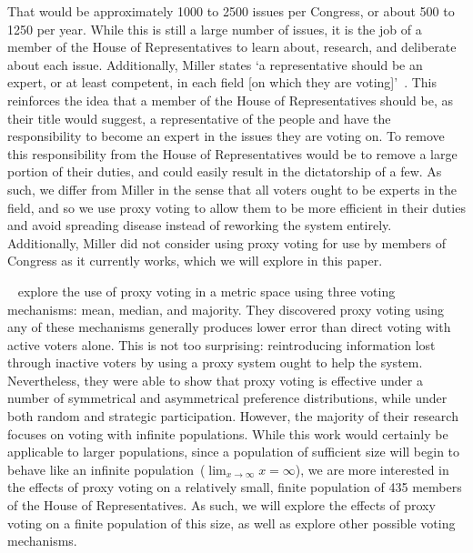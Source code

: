 That would be approximately 1000 to 2500 issues per Congress, or about 500 to 1250 per
year.
While this is still a large number of issues, it is the job of a member of the House
of Representatives to learn about, research, and deliberate about each issue.
Additionally, Miller states `a representative should be an expert, or at least
competent, in each field [on which they are voting]'~\cite{Miller1969}.
This reinforces the idea that a member of the House of Representatives should be, as
their title would suggest, a representative of the people and have the responsibility
to become an expert in the issues they are voting on.
To remove this responsibility from the House of Representatives would be to remove
a large portion of their duties, and could easily result in the dictatorship of a few.
As such, we differ from Miller in the sense that all voters ought to be experts in
the field, and so we use proxy voting to allow them to be more efficient in their
duties and avoid spreading disease instead of reworking the system entirely.
Additionally, Miller did not consider using proxy voting for use by members of
Congress as it currently works, which we will explore in this paper.

~\cite{Cohensius2017} explore the use of proxy voting in a metric space
using three voting mechanisms: mean, median, and majority.
They discovered proxy voting using any of these mechanisms generally produces lower
error than direct voting with active voters alone.
This is not too surprising: reintroducing information lost through inactive voters by
using a proxy system ought to help the system.
Nevertheless, they were able to show that proxy voting is effective under a number of
symmetrical and asymmetrical preference distributions, while under both random and
strategic participation.
However, the majority of their research focuses on voting with infinite populations.
While this work would certainly be applicable to larger populations, since a
population of sufficient size will begin to behave like an infinite
population~($\lim_{x \rightarrow \infty} x = \infty$), we are more interested in the
effects of proxy voting on a relatively small, finite population of 435 members of the
House of Representatives.
As such, we will explore the effects of proxy voting on a finite population of this
size, as well as explore other possible voting mechanisms.


